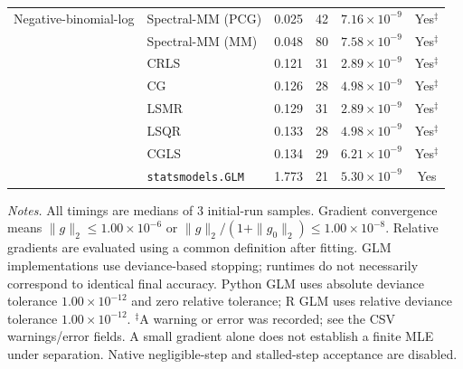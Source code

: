 \documentclass[10pt,a4paper]{article}
\begin{document}
\begin{longtable}{llrrrc}
\midrule
Negative-binomial-log & Spectral-MM (PCG) & 0.025 & 42 & $7.16\times10^{-9}$ & Yes$^{\ddagger}$ \\
 & Spectral-MM (MM) & 0.048 & 80 & $7.58\times10^{-9}$ & Yes$^{\ddagger}$ \\
 & CRLS & 0.121 & 31 & $2.89\times10^{-9}$ & Yes$^{\ddagger}$ \\
 & CG & 0.126 & 28 & $4.98\times10^{-9}$ & Yes$^{\ddagger}$ \\
 & LSMR & 0.129 & 31 & $2.89\times10^{-9}$ & Yes$^{\ddagger}$ \\
 & LSQR & 0.133 & 28 & $4.98\times10^{-9}$ & Yes$^{\ddagger}$ \\
 & CGLS & 0.134 & 29 & $6.21\times10^{-9}$ & Yes$^{\ddagger}$ \\
 & \texttt{statsmodels.GLM} & 1.773 & 21 & $5.30\times10^{-9}$ & Yes \\
\end{longtable}
\noindent\textit{Notes.} All timings are medians of 3 initial-run samples.
Gradient convergence means $\|g\|_2\leq 1.00\times10^{-6}$ or $\|g\|_2/(1+\|g_0\|_2)\leq 1.00\times10^{-8}$.
Relative gradients are evaluated using a common definition after fitting. GLM implementations use deviance-based stopping; runtimes do not necessarily correspond to identical final accuracy.
Python GLM uses absolute deviance tolerance $1.00\times10^{-12}$ and zero relative tolerance; R GLM uses relative deviance tolerance $1.00\times10^{-12}$.
$^{\ddagger}$A warning or error was recorded; see the CSV warnings/error fields. A small gradient alone does not establish a finite MLE under separation.
Native negligible-step and stalled-step acceptance are disabled.
\par
\endgroup
\end{document}
